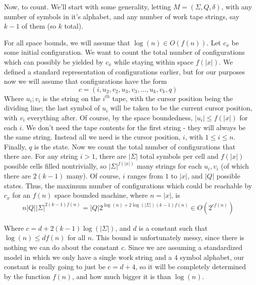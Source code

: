 \documentclass{article}
\theoremstyle{definition}
\theoremstyle{plain}
\theoremstyle{theorem}
\begin{document}
Now, to count. We'll start with some generality, letting $M = (\Sigma,Q,\delta)$, with any number of symbols in it's alphabet, and any number of work tape strings, say $k-1$ of them (so $k$ total). 
\par For all space bounds, we will assume that $\log(n) \in O(f(n))$. Let $c_x$ be some initial configuration. We want to count the total number of configurations which can possibly be yielded by $c_x$ while staying within space $f(|x|)$. We defined a standard representation of configurations earlier, but for our purposes now we will assume that configurations have the form
\[ c=(i,u_2,v_2,u_3,v_3,...,u_k,v_k,q) \]
Where $u_i;v_i$ is the string on the $i^{th}$ tape, with the cursor position being the dividing line; the last symbol of $u_i$ will be taken to be the current cursor position, with $v_i$ everything after. Of course, by the space boundedness, $|u_i| \leq f(|x|)$ for each $i$. We don't need the tape contents for the first string - they will always be the same string. Instead all we need is the cursor position, $i$, with $1 \leq i \leq n$. Finally, $q$ is the state. Now we count the total number of configurations that there are. For any string $i>1$, there are $|\Sigma|$ total symbols per cell and $f(|x|)$ possible cells filled nontrivially, so $|\Sigma|^{f(|x|)}$ many strings for each $u_i,v_i$ (of which there are $2(k-1)$ many). Of course, $i$ ranges from $1$ to $|x|$, and $|Q|$ possible states.
Thus, the maximum number of configurations which could be reachable by $c_x$ for an $f(n)$ space bounded machine, where $n=|x|$, is
\begin{align}
n|Q||\Sigma|^{2(k-1)f(n)} = |Q|2^{\log(n)+2\log(|\Sigma|)(k-1)f(n)} \in O(2^{cf(n)})
\end{align}
\par Where $c = d + 2(k-1)\log(|\Sigma|)$, and $d$ is a constant such that $\log(n) \leq df(n)$ for all $n$. This bound is unfortunately messy, since there is nothing we can do about the constant $c$. Since we are assuming a standardized model in which we only have a single work string and a $4$ symbol alphabet, our constant is really going to just be $c = d+4$, so it will be completely determined by the function $f(n)$, and how much bigger it is than $\log(n)$. 
\end{document}
